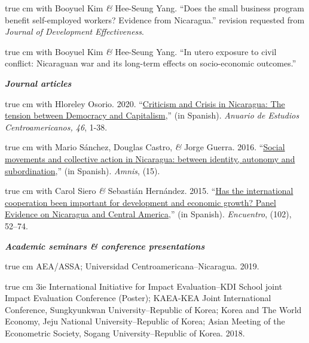 \documentclass[11pt,article,oneside, a4paper]{memoir}
\def\ind{\hangindent=1 true cm\hangafter=1 \noindent}
\begin{document}
\ind with Booyuel Kim \textit{\&} Hee-Seung Yang. ``Does the small business program benefit self-employed workers? Evidence from Nicaragua.'' revision requested from \textit{Journal of Development Effectiveness}.

\ind with Booyuel Kim \textit{\&} Hee-Seung Yang. ``In utero exposure to civil conflict: Nicaraguan war and its long-term effects on socio-economic outcomes.''

\medskip
\noindent\emph{\textbf{Journal articles} \vspace{0.05in}}
 

\ind with Hloreley Osorio. 2020. ``\href{https://revistas.ucr.ac.cr/index.php/anuario/article/view/45081/44860}{Criticism and Crisis in Nicaragua: The tension between Democracy and Capitalism},'' (in Spanish). \emph{Anuario de Estudios Centroamericanos, 46}, 1-38.

\ind with Mario Sánchez, Douglas Castro, \textit{\&} Jorge Guerra. 2016. ``\href{https://amnis.revues.org/2813}{Social movements and collective action in Nicaragua: between identity, autonomy and subordination},'' (in Spanish). \emph{Amnis}, (15).

\ind with Carol Siero \textit{\&} Sebastián Hernández. 2015. ``\href{http://www.uca.edu.ni/2/images/Revista-Encuentro/Revistas/e102/art-5.pdf}{Has the international cooperation been important for development and economic growth? Panel Evidence on Nicaragua and Central America},'' (in Spanish). \emph{Encuentro}, (102), 52--74.


\medskip
\noindent\emph{\textbf{Academic seminars \& conference presentations} \vspace{0.05in}}

\ind AEA/ASSA; Universidad Centroamericana--Nicaragua. 2019.

\ind 3ie International Initiative for Impact Evaluation--KDI School joint Impact Evaluation Conference (Poster); KAEA-KEA Joint International Conference, Sungkyunkwan University–Republic of Korea; Korea and The World Economy, Jeju National
University–Republic of Korea; Asian Meeting of the Econometric Society, Sogang University–Republic
of Korea. 2018. 
\end{document}

